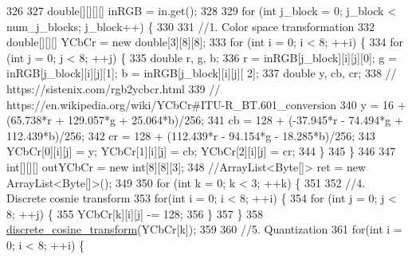 \begin{DoxyCode}
326 
327             \textcolor{keywordtype}{double}[][][][] inRGB = in.get();
328 
329             \textcolor{keywordflow}{for} (\textcolor{keywordtype}{int} j\_block = 0; j\_block < num\_j\_blocks; j\_block++)  \{
330                 
331                 \textcolor{comment}{//1. Color space transformation}
332                 \textcolor{keywordtype}{double}[][][] YCbCr = \textcolor{keyword}{new} \textcolor{keywordtype}{double}[3][8][8];
333                 \textcolor{keywordflow}{for} (\textcolor{keywordtype}{int} i = 0; i < 8; ++i) \{
334                     \textcolor{keywordflow}{for} (\textcolor{keywordtype}{int} j = 0; j < 8; ++j) \{
335                         \textcolor{keywordtype}{double} r, g, b;
336                         r = inRGB[j\_block][i][j][0]; g = inRGB[j\_block][i][j][1]; b = inRGB[j\_block][i][j][
      2];
337                         \textcolor{keywordtype}{double} y, cb, cr;
338                         \textcolor{comment}{// https://sistenix.com/rgb2ycbcr.html}
339                         \textcolor{comment}{// https://en.wikipedia.org/wiki/YCbCr#ITU-R\_BT.601\_conversion}
340                         y = 16 + (65.738*r + 129.057*g + 25.064*b)/256;
341                         cb = 128 + (-37.945*r - 74.494*g + 112.439*b)/256;
342                         cr = 128 + (112.439*r - 94.154*g - 18.285*b)/256;
343                         YCbCr[0][i][j] = y; YCbCr[1][i][j] = cb; YCbCr[2][i][j] = cr;
344                     \}
345                 \}
346                 
347                 \textcolor{keywordtype}{int}[][][] outYCbCr = \textcolor{keyword}{new} \textcolor{keywordtype}{int}[8][8][3];
348                 \textcolor{comment}{//ArrayList<Byte[]> ret = new ArrayList<Byte[]>();}
349                         
350                 \textcolor{keywordflow}{for} (\textcolor{keywordtype}{int} k = 0; k < 3; ++k) \{
351                     
352                     \textcolor{comment}{//4. Discrete cosnie transform}
353                     \textcolor{keywordflow}{for}(\textcolor{keywordtype}{int} i = 0; i < 8; ++i) \{
354                         \textcolor{keywordflow}{for} (\textcolor{keywordtype}{int} j = 0; j < 8; ++j) \{
355                             YCbCr[k][i][j] -= 128;
356                         \}
357                     \}
358                     \hyperlink{classdomini_1_1algorithm_1_1JPEG_a367e6d1e6543bf3d8c847aae36f4b6bf}{discrete\_cosine\_transform}(YCbCr[k]);
359                     
360                     \textcolor{comment}{//5. Quantization}
361                     \textcolor{keywordflow}{for}(\textcolor{keywordtype}{int} i = 0; i < 8; ++i) \{

\end{DoxyCode}
